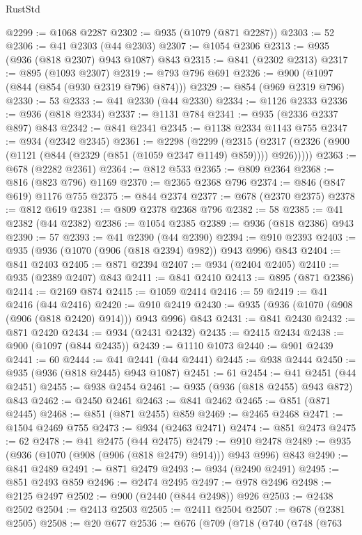 \begin{lexlean}{RustStd}
\begin{coremodule}
@2299 := @1068 @2287
@2302 := @935 (@1079 (@871 @2287))
@2303 := 52
@2306 := @41 @2303 (@44 @2303)
@2307 := @1054 @2306
@2313 := @935 (@936 (@818 @2307) @943 @1087) @843
@2315 := @841 (@2302 @2313)
@2317 := @895 (@1093 @2307)
@2319 := @793 @796 @691
@2326 := @900 (@1097 (@844 (@854 (@930 @2319 @796) @874)))
@2329 := @854 (@969 @2319 @796)
@2330 := 53
@2333 := @41 @2330 (@44 @2330)
@2334 := @1126 @2333
@2336 := @936 (@818 @2334)
@2337 := @1131 @784
@2341 := @935 (@2336 @2337 @897) @843
@2342 := @841 @2341
@2345 := @1138 @2334 @1143 @755
@2347 := @934 (@2342 @2345)
@2361 := @2298
    (@2299
      (@2315 (@2317 (@2326 (@900 (@1121 (@844 (@2329 (@851 (@1059 @2347 @1149) @859)))) @926)))))
@2363 := @678 (@2282 @2361)
@2364 := @812 @533
@2365 := @809 @2364
@2368 := @816 (@823 @796) @1169
@2370 := @2365 @2368 @796
@2374 := @846 (@847 @619) @1176 @755
@2375 := @844 @2374
@2377 := @678 (@2370 @2375)
@2378 := @812 @619
@2381 := @809 @2378 @2368 @796
@2382 := 58
@2385 := @41 @2382 (@44 @2382)
@2386 := @1054 @2385
@2389 := @936 (@818 @2386) @943
@2390 := 57
@2393 := @41 @2390 (@44 @2390)
@2394 := @910 @2393
@2403 := @935 (@936 (@1070 (@906 (@818 @2394) @982)) @943 @996) @843
@2404 := @841 @2403
@2405 := @871 @2394
@2407 := @934 (@2404 @2405)
@2410 := @935 (@2389 @2407) @843
@2411 := @841 @2410
@2413 := @895 (@871 @2386)
@2414 := @2169 @874
@2415 := @1059 @2414
@2416 := 59
@2419 := @41 @2416 (@44 @2416)
@2420 := @910 @2419
@2430 := @935 (@936 (@1070 (@908 (@906 (@818 @2420) @914))) @943 @996) @843
@2431 := @841 @2430
@2432 := @871 @2420
@2434 := @934 (@2431 @2432)
@2435 := @2415 @2434
@2438 := @900 (@1097 (@844 @2435))
@2439 := @1110 @1073
@2440 := @901 @2439
@2441 := 60
@2444 := @41 @2441 (@44 @2441)
@2445 := @938 @2444
@2450 := @935 (@936 (@818 @2445) @943 @1087)
@2451 := 61
@2454 := @41 @2451 (@44 @2451)
@2455 := @938 @2454
@2461 := @935 (@936 (@818 @2455) @943 @872) @843
@2462 := @2450 @2461
@2463 := @841 @2462
@2465 := @851 (@871 @2445)
@2468 := @851 (@871 @2455) @859
@2469 := @2465 @2468
@2471 := @1504 @2469 @755
@2473 := @934 (@2463 @2471)
@2474 := @851 @2473
@2475 := 62
@2478 := @41 @2475 (@44 @2475)
@2479 := @910 @2478
@2489 := @935 (@936 (@1070 (@908 (@906 (@818 @2479) @914))) @943 @996) @843
@2490 := @841 @2489
@2491 := @871 @2479
@2493 := @934 (@2490 @2491)
@2495 := @851 @2493 @859
@2496 := @2474 @2495
@2497 := @978 @2496
@2498 := @2125 @2497
@2502 := @900 (@2440 (@844 @2498)) @926
@2503 := @2438 @2502
@2504 := @2413 @2503
@2505 := @2411 @2504
@2507 := @678 (@2381 @2505)
@2508 := @20 @677
@2536 := @676
    (@709
      (@718
        (@740
          (@748
            (@763

\end{coremodule}
\end{lexlean}
